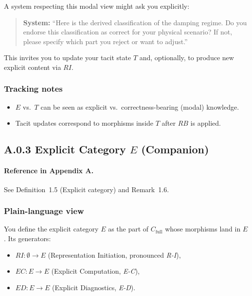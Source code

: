 A system respecting this modal view might ask you explicitly:

\begin{quote}
\textbf{System:} 
``Here is the derived classification of the damping regime. 
Do you endorse this classification as correct for your physical scenario? 
If not, please specify which part you reject or want to adjust.''
\end{quote}

This invites you to update your tacit state $T$ and, optionally, to produce new explicit content via
$RI$.

\subsubsection*{Tracking notes}

\begin{itemize}
 \item $E$ vs.\ $T$ can be seen as explicit vs.\ correctness-bearing (modal) knowledge.
 \item Tacit updates correspond to morphisms inside $T$ after $RB$ is applied.
\end{itemize}

\newpage

\subsection{A.0.3 Explicit Category $E$ (Companion)}

\paragraph{Reference in Appendix A.}
See Definition~1.5 (Explicit category) and Remark~1.6.

\subsubsection*{Plain-language view}

You define the explicit category $E$ as the part of $C_{\text{full}}$ whose morphisms land in $E$.
Its generators:

\begin{itemize}
 \item $RI : \emptyset \to E$ (Representation Initiation, pronounced \emph{R-I}),
 \item $EC : E \to E$ (Explicit Computation, \emph{E-C}),
 \item $ED : E \to E$ (Explicit Diagnostics, \emph{E-D}).
\end{itemize}

